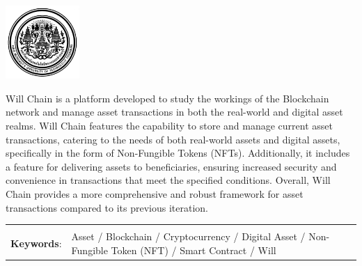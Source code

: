 \documentclass[12pt,oneside,openright,a4paper]{cpe-thai-project}
\begin{document}
\pdfstringdefDisableCommands{%
\let\MakeUppercase\relax
}

\begin{center}
  \includegraphics[width=2.8cm]{logo02.jpg}
\end{center}
\vspace*{-1cm}

\maketitlepage
\makesignaturepage 

\abstract


Will Chain is a platform developed to study the workings of the Blockchain network and manage asset transactions in both the real-world and digital asset realms. Will Chain features the capability to store and manage current asset transactions, catering to the needs of both real-world assets and digital assets, specifically in the form of Non-Fungible Tokens (NFTs). Additionally, it includes a feature for delivering assets to beneficiaries, ensuring increased security and convenience in transactions that meet the specified conditions. Overall, Will Chain provides a more comprehensive and robust framework for asset transactions compared to its previous iteration.

\begin{flushleft}
\begin{tabular*}{\textwidth}{@{}lp{}}
 & \\
\textbf{Keywords}: & Asset / Blockchain / Cryptocurrency / Digital Asset / Non-Fungible Token (NFT) /  Smart Contract / Will 
\end{tabular*}
\end{flushleft}
\endabstract

\newcommand\tab[1][1cm]{\hspace*{#1}}
\thaiabstract
\end{document}
